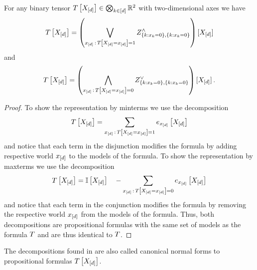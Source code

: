 \begin{theorem}\label{the:tensorToMaxMinTerms}
	For any binary tensor $T\left[X_{[d]}\right]\in\bigotimes_{k\in[d]}\mathbb{R}^2$ with two-dimensional axes we have
	\begin{align*}
		T\left[X_{[d]}\right] = \left( \bigvee_{x_{[d]} \, : \, T\left[X_{[d]}=x_{[d]}\right] = 1} 
		Z^{\land}_{\{k : x_{k}=0\},\{k : x_{k}=0\}} 
		\right)
		[X_{[d]}] 
	\end{align*}
	and
	\begin{align*}
		T\left[X_{[d]}\right] = \left( \bigwedge_{x_{[d]} \, : \, T\left[X_{[d]}=x_{[d]}\right] = 0} 
		Z^{\lor}_{\{k : x_{k}=0\},\{k : x_{k}=0\}} 
		\right)
		[X_{[d]}] \, .
	\end{align*}
\end{theorem}
\begin{proof}
	To show the representation by minterms we use the decomposition
	\begin{align*}
		T\left[X_{[d]}\right]  = \sum_{x_{[d]} \, : \, T\left[X_{[d]}=x_{[d]}\right] = 1} e_{x_{[d]}}\left[X_{[d]}\right]
	\end{align*}
	and notice that each term in the disjunction modifies the formula by adding respective world $x_{[d]}$ to the models of the formula.
	To show the representation by maxterms we use the decomposition
	\begin{align*}
		T\left[X_{[d]}\right]  = \mathbb{I}\left[X_{[d]}\right] \quad - \sum_{x_{[d]} \, : \, T\left[X_{[d]}=x_{[d]}\right] = 0} e_{x_{[d]}}\left[X_{[d]}\right]
	\end{align*}
	and notice that each term in the conjunction modifies the formula by removing the respective world $x_{[d]}$ from the models of the formula.	
	Thus, both decompositions are propositional formulas with the same set of models as the formula $T$ and are thus identical to $T$.
\end{proof}


The decompositions found in  are also called canonical normal forms to propositional formulas $T\left[X_{[d]}\right]$.

